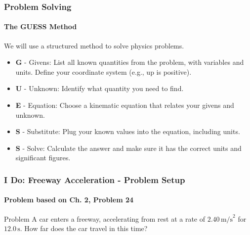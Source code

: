 \documentclass{beamer}
\begin{document}
\begin{frame}
\frametitle{Problem Solving}
\framesubtitle{The GUESS Method}
We will use a structured method to solve physics problems.
\begin{itemize}
    \item \textbf{G} - \alert{Givens}: List all known quantities from the problem, with variables and units. Define your coordinate system (e.g., up is positive).
    \item \textbf{U} - \alert{Unknown}: Identify what quantity you need to find.
    \item \textbf{E} - \alert{Equation}: Choose a kinematic equation that relates your givens and unknown.
    \item \textbf{S} - \alert{Substitute}: Plug your known values into the equation, including units.
    \item \textbf{S} - \alert{Solve}: Calculate the answer and make sure it has the correct units and significant figures.
\end{itemize}
\end{frame}

\begin{frame}
\frametitle{I Do: Freeway Acceleration - Problem Setup}
\framesubtitle{Problem based on Ch. 2, Problem 24}
\begin{block}{Problem}
A car enters a freeway, accelerating from rest at a rate of $2.40 \, \text{m/s}^2$ for $12.0 \, \text{s}$. How far does the car travel in this time?
\end{block}
\pause
{}
\end{frame}
\end{document}
